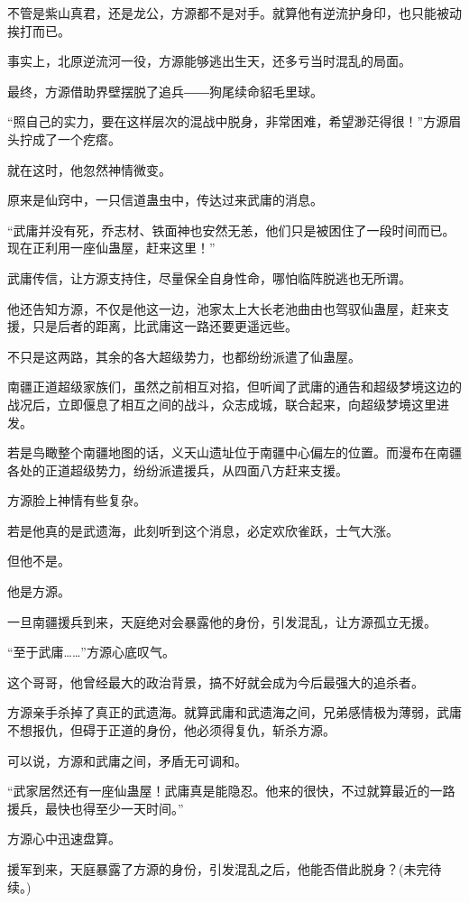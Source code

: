 \begin{this_body}
不管是紫山真君，还是龙公，方源都不是对手。就算他有逆流护身印，也只能被动挨打而已。

事实上，北原逆流河一役，方源能够逃出生天，还多亏当时混乱的局面。

最终，方源借助界壁摆脱了追兵――狗尾续命貂毛里球。

“照自己的实力，要在这样层次的混战中脱身，非常困难，希望渺茫得很！”方源眉头拧成了一个疙瘩。

就在这时，他忽然神情微变。

原来是仙窍中，一只信道蛊虫中，传达过来武庸的消息。

“武庸并没有死，乔志材、铁面神也安然无恙，他们只是被困住了一段时间而已。现在正利用一座仙蛊屋，赶来这里！”

武庸传信，让方源支持住，尽量保全自身性命，哪怕临阵脱逃也无所谓。

他还告知方源，不仅是他这一边，池家太上大长老池曲由也驾驭仙蛊屋，赶来支援，只是后者的距离，比武庸这一路还要更遥远些。

不只是这两路，其余的各大超级势力，也都纷纷派遣了仙蛊屋。

南疆正道超级家族们，虽然之前相互对掐，但听闻了武庸的通告和超级梦境这边的战况后，立即偃息了相互之间的战斗，众志成城，联合起来，向超级梦境这里进发。

若是鸟瞰整个南疆地图的话，义天山遗址位于南疆中心偏左的位置。而漫布在南疆各处的正道超级势力，纷纷派遣援兵，从四面八方赶来支援。

方源脸上神情有些复杂。

若是他真的是武遗海，此刻听到这个消息，必定欢欣雀跃，士气大涨。

但他不是。

他是方源。

一旦南疆援兵到来，天庭绝对会暴露他的身份，引发混乱，让方源孤立无援。

“至于武庸……”方源心底叹气。

这个哥哥，他曾经最大的政治背景，搞不好就会成为今后最强大的追杀者。

方源亲手杀掉了真正的武遗海。就算武庸和武遗海之间，兄弟感情极为薄弱，武庸不想报仇，但碍于正道的身份，他必须得复仇，斩杀方源。

可以说，方源和武庸之间，矛盾无可调和。

“武家居然还有一座仙蛊屋！武庸真是能隐忍。他来的很快，不过就算最近的一路援兵，最快也得至少一天时间。”

方源心中迅速盘算。

援军到来，天庭暴露了方源的身份，引发混乱之后，他能否借此脱身？(未完待续。)

\end{this_body}

